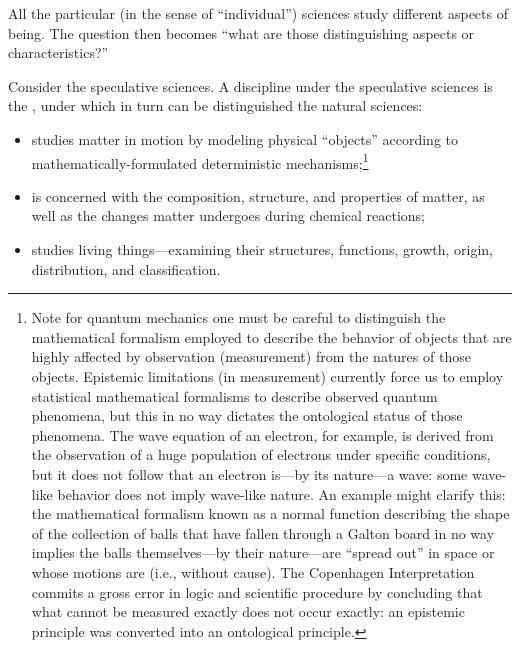 All the particular (in the sense of ``individual'') sciences study different aspects of being. The question then becomes ``what are those  distinguishing aspects or characteristics?''

Consider the speculative sciences. A discipline under the speculative sciences is the , under which in turn can be distinguished the natural sciences:

\begin{itemize}
\item {} studies matter in motion by modeling physical ``objects'' according to mathematically-formulated deterministic mechanisms;\footnote{Note for quantum mechanics one must be careful to distinguish the mathematical formalism employed to describe the behavior of objects that are highly affected by observation (measurement) from the natures of those objects. Epistemic limitations (in measurement) currently force us to employ statistical mathematical formalisms to describe observed quantum phenomena, but this in no way dictates the ontological status of those phenomena. The wave equation of an electron, for example, is derived from the observation of a huge population of electrons under specific conditions, but it does not follow that an electron is---by its nature---a wave: some wave-like behavior does not imply wave-like nature. An example might clarify this: the mathematical formalism known as a normal function describing the shape of the collection of balls that have fallen through a Galton board in no way implies the balls themselves---by their nature---are ``spread out'' in space or whose motions are  (i.e., without cause). The Copenhagen Interpretation commits a gross error in logic and scientific procedure by concluding that what cannot be measured exactly does not occur exactly: an epistemic principle was converted into an ontological principle.}
\item {} is concerned with the composition, structure, and properties of matter, as well as the changes matter undergoes during chemical reactions;
\item {} studies living things---examining their structures, functions, growth, origin, distribution, and classification.
\end{itemize}

